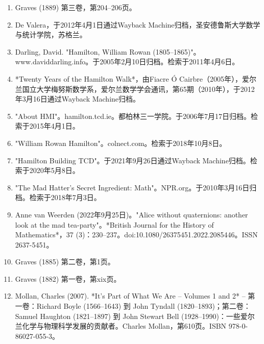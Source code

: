 \begin{enumerate}
\item Graves (1889) 第三卷，第204–206页。  
\item De Valera，于2012年4月1日通过Wayback Machine归档，圣安德鲁斯大学数学与统计学院，苏格兰。  
\item Darling, David. "Hamilton, William Rowan (1805–1865)"。www.daviddarling.info。于2005年2月10日归档。检索于2011年4月6日。  
\item *Twenty Years of the Hamilton Walk*，由Fiacre Ó Cairbre（2005年），爱尔兰国立大学梅努斯数学系，爱尔兰数学学会通讯，第65期（2010年），于2012年3月16日通过Wayback Machine归档。  
\item "About HMI"。hamilton.tcd.ie。都柏林三一学院。于2006年7月17日归档。检索于2015年4月1日。  
\item "William Rowan Hamilton"。colnect.com。检索于2018年10月8日。  
\item "Hamilton Building TCD"。于2021年9月26日通过Wayback Machine归档。检索于2020年5月8日。  
\item "The Mad Hatter's Secret Ingredient: Math"。NPR.org。于2010年3月16日归档。检索于2018年7月3日。  
\item Anne van Weerden (2022年9月25日)。"Alice without quaternions: another look at the mad tea-party"。*British Journal for the History of Mathematics*，37 (3)：230–237。doi:10.1080/26375451.2022.2085446。ISSN 2637-5451。  
\item Graves (1885) 第二卷，第1页。  
\item Graves (1882) 第一卷，第xix页。  
\item Mollan, Charles (2007). *It's Part of What We Are – Volumes 1 and 2* – 第一卷：Richard Boyle (1566–1643) 到 John Tyndall (1820–1893)；第二卷：Samuel Haughton (1821–1897) 到 John Stewart Bell (1928–1990)：一些爱尔兰化学与物理科学发展的贡献者。Charles Mollan，第610页。ISBN 978-0-86027-055-3。
\end{enumerate}